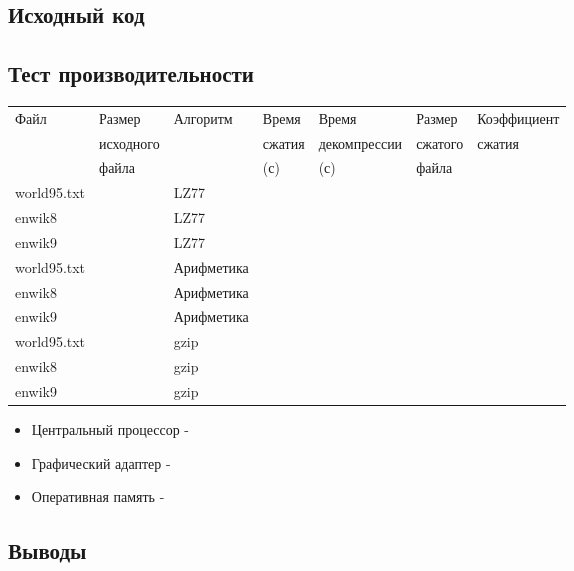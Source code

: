 \documentclass[12pt]{article}
\begin{document}
\subsection*{Исходный код}%

\subsection*{Тест производительности}%

\noindent
\begin{tabular}{| l | l | l | l | l | l | l |}
	\hline
	Файл             & Размер 	 & Алгоритм & Время  & Время        & Размер  & Коэффициент \\
	& исходного &          & сжатия & декомпрессии & сжатого & сжатия      \\
	& файла     &          & (с)    & (с)          & файла   &	   		    \\
	\hline
	world95.txt      & & LZ77       & & & &\\
	\hline
	enwik8           & & LZ77       & & & &\\
	\hline
	enwik9           & & LZ77       & & & &\\
	\hline
	world95.txt      & & Арифметика & & & &\\
	\hline
	enwik8           & & Арифметика & & & &\\
	\hline
	enwik9           & & Арифметика & & & &\\
	\hline
	world95.txt      & & gzip       & & & &\\
	\hline
	enwik8           & & gzip       & & & &\\
	\hline
	enwik9           & & gzip       & & & &\\
	\hline
	
	
\end{tabular}


\begin{itemize}
	\item Центральный процессор - 
	\item Графический адаптер - 
	\item Оперативная память - 
\end{itemize}

\subsection*{Выводы}
\end{document}
